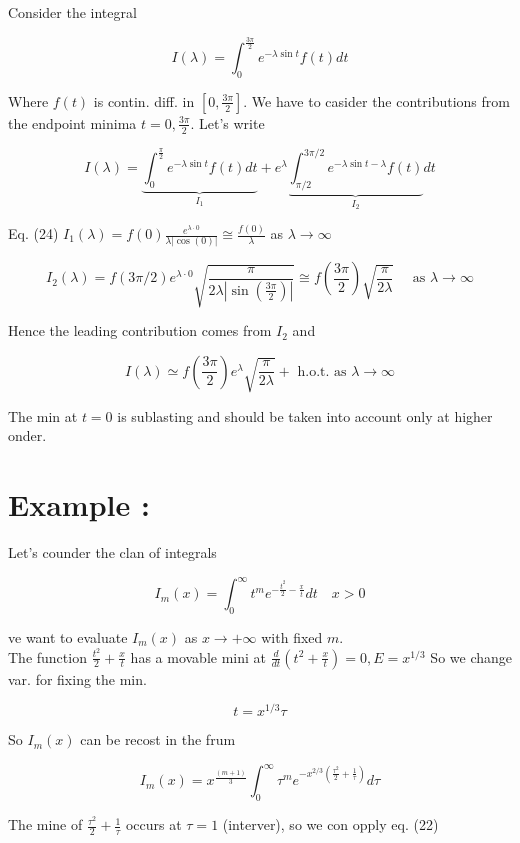\documentclass[10pt]{article}
\begin{document}
Consider the integral

$$
I(\lambda)=\int_{0}^{\frac{3 \pi}{2}} e^{-\lambda \sin t} f(t) d t
$$

Where $f(t)$ is contin. diff. in $\left[0, \frac{3 \pi}{2}\right]$. We have to casider the contributions from the endpoint minima $t=0, \frac{3 \pi}{2}$. Let's write

$$
I(\lambda)=\underbrace{\int_{0}^{\frac{\pi}{2}} e^{-\lambda \sin t} f(t) d t}_{I_{1}}+e^{\lambda} \underbrace{\int_{\pi / 2}^{3 \pi / 2} e^{-\lambda \sin t-\lambda} f(t)}_{I_{2}} d t
$$

Eq. (24) $I_{1}(\lambda)=f(0) \frac{e^{\lambda \cdot 0}}{\lambda|\cos (0)|} \cong \frac{f(0)}{\lambda}$ as $\lambda \rightarrow \infty$

$$
I_{2}(\lambda)=f(3 \pi / 2) e^{\lambda \cdot 0} \sqrt{\frac{\pi}{2 \lambda\left|\sin \left(\frac{3 \pi}{2}\right)\right|}} \cong f\left(\frac{3 \pi}{2}\right) \sqrt{\frac{\pi}{2 \lambda}} \quad \text { as } \lambda \rightarrow \infty
$$

Hence the leading contribution comes from $I_{2}$ and

$$
I(\lambda) \simeq f\left(\frac{3 \pi}{2}\right) e^{\lambda} \sqrt{\frac{\pi}{2 \lambda}}+\text { h.o.t. as } \lambda \rightarrow \infty
$$

The min at $t=0$ is sublasting and should be taken into account only at higher onder.

\section*{Example :}
Let's counder the clan of integrals

$$
I_{m}(x)=\int_{0}^{\infty} t^{m} e^{-\frac{t^{2}}{2}-\frac{x}{t}} d t \quad x>0
$$

ve want to evaluate $I_{m}(x)$ as $x \rightarrow+\infty$ with fixed $m$.\\
The function $\frac{t^{2}}{2}+\frac{x}{t}$ has a movable mini at $\frac{d}{d t}\left(t^{2}+\frac{x}{t}\right)=0, E=x^{1 / 3}$ So we change var. for fixing the min.

$$
t=x^{1 / 3} \tau
$$

So $I_{m}(x)$ can be recost in the frum

$$
I_{m}(x)=x^{\frac{(m+1)}{3}} \int_{0}^{\infty} \tau^{m} e^{-x^{2 / 3}\left(\frac{\tau^{2}}{2}+\frac{1}{\tau}\right)} d \tau
$$

The mine of $\frac{\tau^{2}}{2}+\frac{1}{\tau}$ occurs at $\tau=1$ (interver), so we con opply eq. (22)
\end{document}
